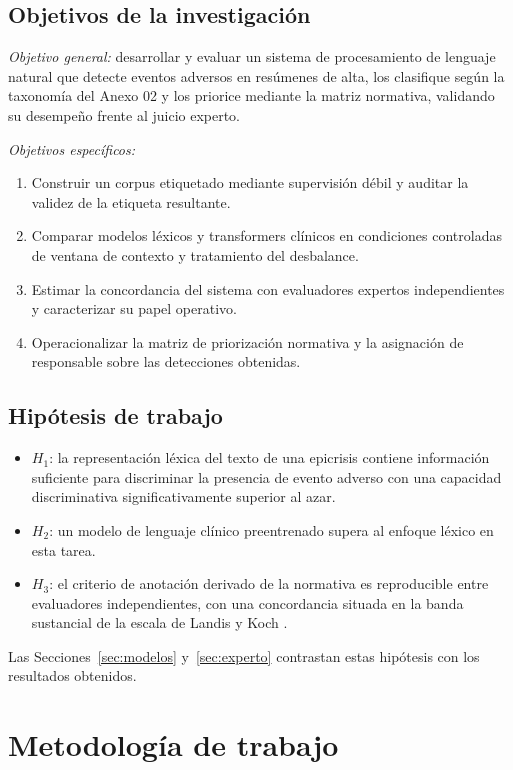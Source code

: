 \documentclass[conference]{IEEEtran}
\begin{document}
\subsection{Objetivos de la investigación}

\emph{Objetivo general:} desarrollar y evaluar un sistema de procesamiento de
lenguaje natural que detecte eventos adversos en resúmenes de alta, los
clasifique según la taxonomía del Anexo 02 y los priorice mediante la matriz
normativa, validando su desempeño frente al juicio experto.

\emph{Objetivos específicos:}
\begin{enumerate}
\item Construir un corpus etiquetado mediante supervisión débil y auditar la
validez de la etiqueta resultante.
\item Comparar modelos léxicos y transformers clínicos en condiciones
controladas de ventana de contexto y tratamiento del desbalance.
\item Estimar la concordancia del sistema con evaluadores expertos
independientes y caracterizar su papel operativo.
\item Operacionalizar la matriz de priorización normativa y la asignación de
responsable sobre las detecciones obtenidas.
\end{enumerate}

\subsection{Hipótesis de trabajo}
\begin{itemize}
\item $H_1$: la representación léxica del texto de una epicrisis contiene
información suficiente para discriminar la presencia de evento adverso con una
capacidad discriminativa significativamente superior al azar.
\item $H_2$: un modelo de lenguaje clínico preentrenado supera al enfoque
léxico en esta tarea.
\item $H_3$: el criterio de anotación derivado de la normativa es reproducible
entre evaluadores independientes, con una concordancia situada en la banda
sustancial de la escala de Landis y Koch \cite{landis}.
\end{itemize}

\noindent Las Secciones~\ref{sec:modelos} y~\ref{sec:experto} contrastan
estas hipótesis con los resultados obtenidos.

\section{Metodología de trabajo}
\end{document}
